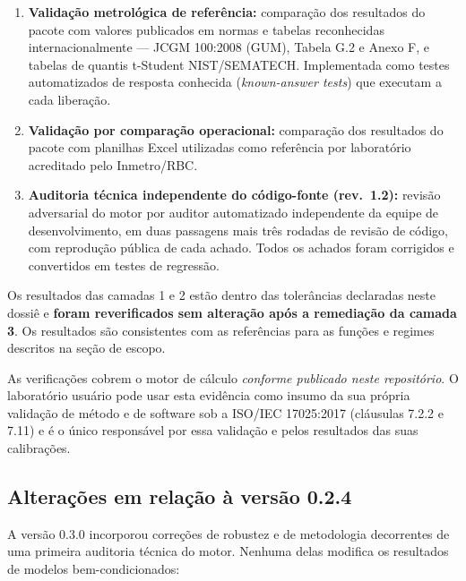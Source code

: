 \documentclass[11pt,a4paper]{article}
\newcommand{\docVersion}{0.3.0}
\newcommand{\docRevision}{1.2}
\begin{document}
\begin{enumerate}
  \item \textbf{Validação metrológica de referência:} comparação dos resultados do pacote com valores publicados em normas e tabelas reconhecidas internacionalmente --- JCGM 100:2008 (GUM), Tabela G.2 e Anexo F, e tabelas de quantis t-Student NIST/SEMATECH. Implementada como testes automatizados de resposta conhecida (\emph{known-answer tests}) que executam a cada liberação.
  \item \textbf{Validação por comparação operacional:} comparação dos resultados do pacote com planilhas Excel utilizadas como referência por laboratório acreditado pelo Inmetro/RBC.
  \item \textbf{Auditoria técnica independente do código-fonte (rev.\ \docRevision):} revisão adversarial do motor por auditor automatizado independente da equipe de desenvolvimento, em duas passagens mais três rodadas de revisão de código, com reprodução pública de cada achado. Todos os achados foram corrigidos e convertidos em testes de regressão.
\end{enumerate}

Os resultados das camadas 1 e 2 estão dentro das tolerâncias declaradas neste dossiê e \textbf{foram reverificados sem alteração após a remediação da camada 3}. Os resultados são consistentes com as referências para as funções e regimes descritos na seção de escopo.

As verificações cobrem o motor de cálculo \emph{conforme publicado neste repositório}. O laboratório usuário pode usar esta evidência como insumo da sua própria validação de método e de software sob a ISO/IEC 17025:2017 (cláusulas 7.2.2 e 7.11) e é o único responsável por essa validação e pelos resultados das suas calibrações.

\subsection{Alterações em relação à versão 0.2.4}

A versão \docVersion{} incorporou correções de robustez e de metodologia decorrentes de uma primeira auditoria técnica do motor. Nenhuma delas modifica os resultados de modelos bem-condicionados:
\end{document}
